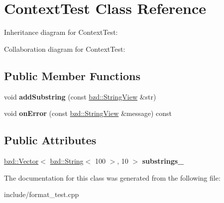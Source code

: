 \hypertarget{classContextTest}{}\section{Context\+Test Class Reference}
\label{classContextTest}


Inheritance diagram for Context\+Test\+:


Collaboration diagram for Context\+Test\+:
\subsection*{Public Member Functions}
\begin{DoxyCompactItemize}
\item 
\mbox{\label{classContextTest_a6dfd0b0358ff274772d07c8b60c55849}} 
void {\bfseries add\+Substring} (const \hyperlink{classbzd_1_1impl_1_1StringView}{bzd\+::\+String\+View} \&str)
\item 
\mbox{\label{classContextTest_a1ed2fabd1120e2e2371565ca6b425c95}} 
void {\bfseries on\+Error} (const \hyperlink{classbzd_1_1impl_1_1StringView}{bzd\+::\+String\+View} \&message) const
\end{DoxyCompactItemize}
\subsection*{Public Attributes}
\begin{DoxyCompactItemize}
\item 
\mbox{\label{classContextTest_ac7a9664b2b454a32c5a7b6816efba84f}} 
\hyperlink{classbzd_1_1Vector}{bzd\+::\+Vector}$<$ \hyperlink{classbzd_1_1String}{bzd\+::\+String}$<$ 100 $>$, 10 $>$ {\bfseries substrings\+\_\+}
\end{DoxyCompactItemize}


The documentation for this class was generated from the following file\+:\begin{DoxyCompactItemize}
\item 
include/format\+\_\+test.\+cpp\end{DoxyCompactItemize}
